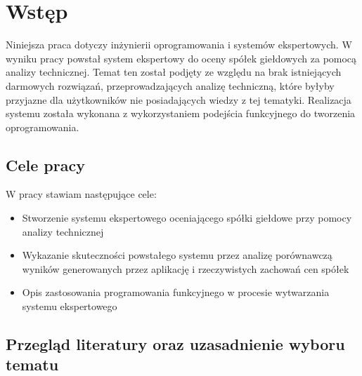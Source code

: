 \chapter{Wstęp}
Niniejsza praca dotyczy inżynierii oprogramowania i systemów ekspertowych. W wyniku pracy powstał system ekspertowy do oceny spółek giełdowych za pomocą analizy technicznej. Temat ten został podjęty ze względu na brak istniejących darmowych rozwiązań, przeprowadzających analizę techniczną, które byłyby przyjazne dla użytkowników nie posiadających wiedzy z tej tematyki. 
Realizacja systemu została wykonana z wykorzystaniem podejścia funkcyjnego do tworzenia oprogramowania.

\section{Cele pracy}\label{sec:cele_pracy}

W pracy stawiam następujące cele:

\begin{itemize}
 \item Stworzenie systemu ekspertowego oceniającego spółki giełdowe przy pomocy analizy technicznej
 \item Wykazanie skuteczności powstałego systemu przez analizę porównawczą wyników generowanych przez aplikację i rzeczywistych zachowań cen spółek
 \item Opis zastosowania programowania funkcyjnego w procesie wytwarzania systemu ekspertowego
\end{itemize}

\section{Przegląd literatury oraz uzasadnienie wyboru tematu}

